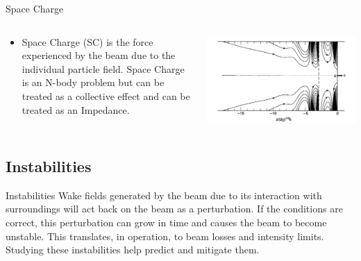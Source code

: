 \documentclass[xcolor=dvipsnames,18]{beamer}
\begin{document}
\begin{frame}{Space Charge}
\begin{columns}[T] %
\begin{column}{.48\textwidth}
\begin{itemize}
    \item Space Charge (SC) is the force experienced by the beam due to the individual particle field. Space Charge is an N-body problem but can be treated as a collective effect and can be treated as an Impedance. 
\end{itemize}
\end{column}%
\hfill%
\begin{column}{.48\textwidth}
\includegraphics[width=1\linewidth]{pic/Wake.png}
\end{column}%
\end{columns}
\end{frame}
\subsection{Instabilities}
\begin{frame}{Instabilities}
Wake fields generated by the beam due to its interaction with surroundings will act back on the beam as a perturbation. If the conditions are correct, this perturbation can grow in time and causes the beam to become unstable. This translates, in operation, to beam losses and intensity limits.  Studying these instabilities help predict and mitigate them. 
\end{frame}
\end{document}
